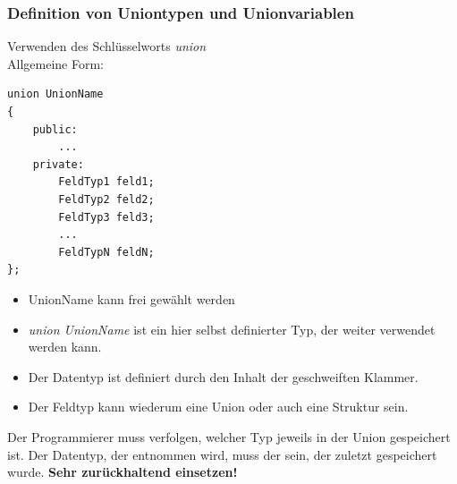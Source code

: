 \subsubsection{Definition von Uniontypen und Unionvariablen}
\begin{multicols}{2}
Verwenden des Schlüsselworts \emph{union}\\
Allgemeine Form:
\begin{minipage}{\linewidth}
\vspace{-\baselineskip}
\begin{lstlisting}
union UnionName
{
	public:				
		...
	private:
		FeldTyp1 feld1;
		FeldTyp2 feld2;
		FeldTyp3 feld3;
		...
		FeldTypN feldN;
};
\end{lstlisting}
\end{minipage}
\vfill\null
\columnbreak
\begin{itemize}
	\item UnionName kann frei gewählt werden
	\item \emph{union UnionName} ist ein hier selbst definierter Typ, der weiter verwendet werden kann.
	\item Der Datentyp ist definiert durch den Inhalt der geschweiften Klammer.
	\item Der Feldtyp kann wiederum eine Union oder auch eine Struktur sein.
\end{itemize}
\end{multicols}
\begin{achtung}
Der Programmierer muss verfolgen, welcher Typ jeweils in der Union gespeichert ist. Der Datentyp, der entnommen wird, muss der sein, der zuletzt gespeichert wurde. \textbf{Sehr zurückhaltend einsetzen!}
\end{achtung}
\vfill
\pagebreak\newpage

